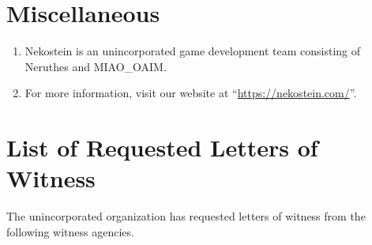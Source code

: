 \documentclass[11pt,a4paper,hidelinks]{article}
\begin{document}
\section{Miscellaneous}
\begin{enumerate}
    \item Nekostein is an unincorporated game development team consisting of Neruthes and MIAO\_OAIM.
    \item For more information, visit our website at ``\href{https://nekostein.com/}{https://nekostein.com/}''.
\end{enumerate}

\section{List of Requested Letters of Witness}
The unincorporated organization has requested letters of witness from the following witness agencies.

\begin{itemize}
    
\end{itemize}
\end{document}
